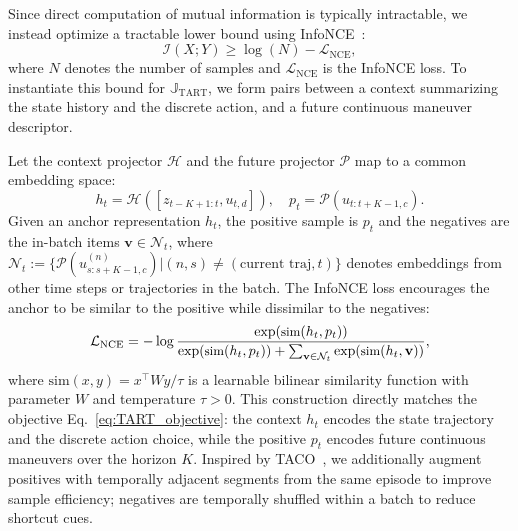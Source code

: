 Since direct computation of mutual information is typically intractable, we instead optimize a tractable lower bound using InfoNCE~\cite{oord2018representation}:
\begin{equation}
    \mathcal{I}(X;Y) \geq \log(N) - \mathcal{L}_{\text{NCE}},
    \label{eq:lower_bound}
\end{equation}
where $N$ denotes the number of samples and $\mathcal{L}_{\text{NCE}}$ is the InfoNCE loss. 
To instantiate this bound for $\mathbb{J}_{\text{TART}}$, we form pairs between a context summarizing the state history and the discrete action, and a future continuous maneuver descriptor.

Let the context projector $\mathcal{H}$ and the future projector $\mathcal{P}$ map to a common embedding space:
\begin{equation}
    h_t = \mathcal{H}([z_{t-K+1:t}, u_{t, d}]), \quad p_t = \mathcal{P}(u_{t:t+K-1,c}).
    \label{eq:projector}
\end{equation}
Given an anchor representation $h_t$, the positive sample is $p_t$ and the negatives are the in-batch items $\mathbf{v} \in \mathcal{N}_t$, where $\mathcal{N}_t :=\{\mathcal{P}(u_{s:s+K-1,c}^{(n)}) | (n, s) \neq (\text{current traj}, t)\}$ denotes embeddings from other time steps or trajectories in the batch.
The InfoNCE loss encourages the anchor to be similar to the positive while dissimilar to the negatives:
\begin{equation}
    \small
    \mathcal{L}_{\text{NCE}} = -\log \frac{\exp(\text{sim}(h_t, p_t))}{\exp(\text{sim}(h_t, p_t)) + \sum_{\mathbf{v} \in \mathcal{N}_t}\exp(\text{sim}(h_t, \mathbf{v}))},
    \label{eq:NCE}
\end{equation}
where $\text{sim}(x, y)=x^\top W y/\tau$ is a learnable bilinear similarity function with parameter $W$ and temperature $\tau>0$.
This construction directly matches the objective Eq.~\eqref{eq:TART_objective}: the context $h_t$ encodes the state trajectory and the discrete action choice, while the positive $p_t$ encodes future continuous maneuvers over the horizon $K$.
Inspired by TACO~\cite{zheng2023taco}, we additionally augment positives with temporally adjacent segments from the same episode to improve sample efficiency; negatives are temporally shuffled within a batch to reduce shortcut cues.